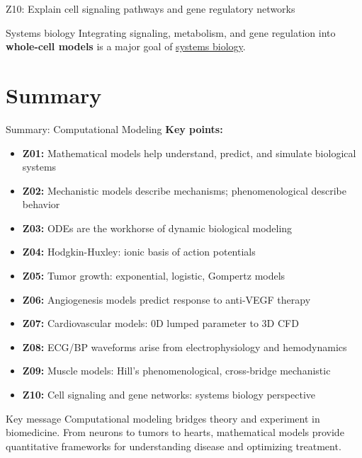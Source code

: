 \documentclass[aspectratio=169, 10pt]{beamer}
\begin{document}
\begin{frame}{Z10: Explain cell signaling pathways and gene regulatory networks}
    \vspace{0.2cm}
    \begin{block}{Systems biology}
        Integrating signaling, metabolism, and gene regulation into \textbf{whole-cell models} is a major goal of \href{https://en.wikipedia.org/wiki/Systems_biology}{systems biology}.
    \end{block}
\end{frame}

\section*{Summary}

\begin{frame}{Summary: Computational Modeling}
    \textbf{Key points:}
    \begin{itemize}
        \item \textbf{Z01:} Mathematical models help understand, predict, and simulate biological systems
        \item \textbf{Z02:} Mechanistic models describe mechanisms; phenomenological describe behavior
        \item \textbf{Z03:} ODEs are the workhorse of dynamic biological modeling
        \item \textbf{Z04:} Hodgkin-Huxley: ionic basis of action potentials
        \item \textbf{Z05:} Tumor growth: exponential, logistic, Gompertz models
        \item \textbf{Z06:} Angiogenesis models predict response to anti-VEGF therapy
        \item \textbf{Z07:} Cardiovascular models: 0D lumped parameter to 3D CFD
        \item \textbf{Z08:} ECG/BP waveforms arise from electrophysiology and hemodynamics
        \item \textbf{Z09:} Muscle models: Hill's phenomenological, cross-bridge mechanistic
        \item \textbf{Z10:} Cell signaling and gene networks: systems biology perspective
    \end{itemize}
    
    \vspace{0.2cm}
    \begin{block}{Key message}
        Computational modeling bridges theory and experiment in biomedicine. From neurons to tumors to hearts, mathematical models provide quantitative frameworks for understanding disease and optimizing treatment.
    \end{block}
\end{frame}
\end{document}
